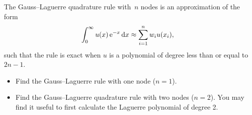 \begin{exercise}
    The Gauss--Laguerre quadrature rule with~$n$ nodes is an approximation of the form
    \[
        \int_{0}^{\infty} u(x) \, \mathrm e^{-x} \, \mathrm d x \approx \sum_{i=1}^{n} w_i u(x_i),
    \]
    such that the rule is exact when $u$ is a polynomial of degree less than or equal to $2n-1$.
    \begin{itemize}
        \item
            Find the Gauss--Laguerre rule with one node ($n = 1$).

        \item
            Find the Gauss--Laguerre quadrature rule with two nodes ($n = 2$).
            You may find it useful to first calculate the Laguerre polynomial of degree 2.
    \end{itemize}
\end{exercise}
